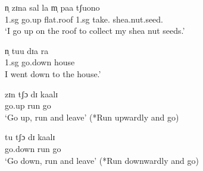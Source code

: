 \begin{exe}
\ex\label{ex:GRM-verb-up-down}
\begin{xlist} 

\ex
\gll n̩ zɪna sal la m̩ paa tʃuono\\
{\sc 1.sg} go.up flat.roof {\foc} {\sc 1.sg} take.{\pv} shea.nut.seed.{\pl}\\
\glt  `I go up on the roof to collect my shea nut seeds.'

\ex
\gll n̩ tuu dɪa ra\\
{\sc 1.sg} go.down house {\foc}\\
\glt I went down to the house.'
\end{xlist}
\end{exe}



\begin{exe}
\ex\label{ex:GRM-preverb-up-down}
\begin{xlist} 

\ex\label{ex:GRM-preverb-up}
\gll zɪn tʃɔ  dɪ kaalɪ  \\
      {go.up} run {\conn} go  \\
\glt  `Go up,  run and leave'  (*Run upwardly and go)

\ex\label{ex:GRM-preverb-down}
\gll tu tʃɔ  dɪ kaalɪ\\
      {go.down} run {\conn} go \\
\glt  `Go down, run and leave'  (*Run downwardly and go)
\end{xlist}
\end{exe}






